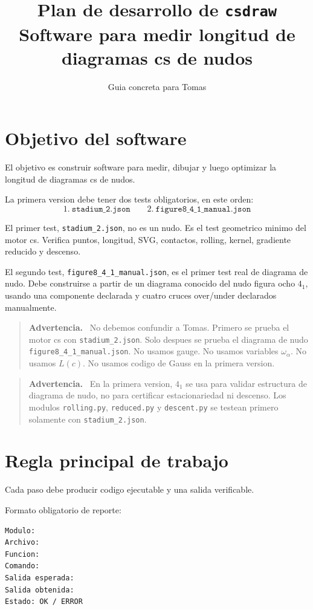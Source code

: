 \documentclass[11pt,letterpaper]{amsart}
\title{Plan de desarrollo de \texttt{csdraw}\\
Software para medir longitud de diagramas cs de nudos}
\author{Guia concreta para Tomas}
\date{}
\newenvironment{warningbox}
{\par\medskip\noindent\begin{quote}\textbf{Advertencia.}\ }
{\end{quote}\par\medskip}
\begin{document}
\maketitle

\section{Objetivo del software}

El objetivo es construir software para medir, dibujar y luego optimizar la
longitud de diagramas cs de nudos.

La primera version debe tener dos tests obligatorios, en este orden:
\[
\boxed{
1.\ \texttt{stadium\_2.json}
}
\qquad
\boxed{
2.\ \texttt{figure8\_4\_1\_manual.json}
}
\]

El primer test, \texttt{stadium\_2.json}, no es un nudo. Es el test geometrico
minimo del motor cs. Verifica puntos, longitud, SVG, contactos, rolling,
kernel, gradiente reducido y descenso.

El segundo test, \texttt{figure8\_4\_1\_manual.json}, es el primer test real de
diagrama de nudo. Debe construirse a partir de un diagrama conocido del nudo
figura ocho \(4_1\), usando una componente declarada y cuatro cruces over/under
declarados manualmente.

\begin{warningbox}
No debemos confundir a Tomas. Primero se prueba el motor cs con
\texttt{stadium\_2.json}. Solo despues se prueba el diagrama de nudo
\texttt{figure8\_4\_1\_manual.json}. No usamos gauge. No usamos variables
\(\omega_\alpha\). No usamos \(L(c)\). No usamos codigo de Gauss en la primera
version.
\end{warningbox}

\begin{warningbox}
En la primera version, \(4_1\) se usa para validar estructura de diagrama de
nudo, no para certificar estacionariedad ni descenso. Los modulos
\texttt{rolling.py}, \texttt{reduced.py} y \texttt{descent.py} se testean
primero solamente con \texttt{stadium\_2.json}.
\end{warningbox}

\section{Regla principal de trabajo}

Cada paso debe producir codigo ejecutable y una salida verificable.

Formato obligatorio de reporte:
\begin{verbatim}
Modulo:
Archivo:
Funcion:
Comando:
Salida esperada:
Salida obtenida:
Estado: OK / ERROR
\end{verbatim}
\end{document}
